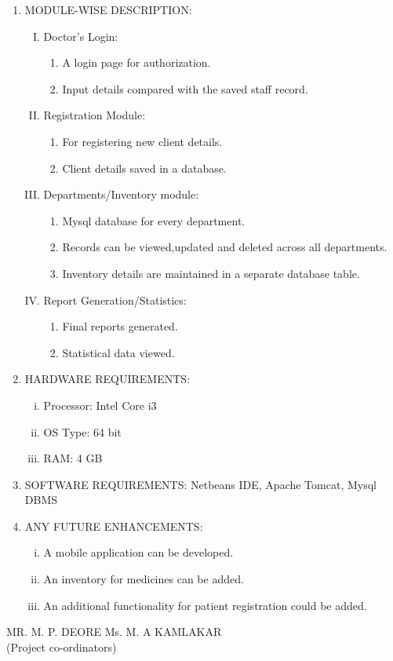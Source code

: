 \documentclass[11pt]{article}
\newcommand\tab[1][1cm]{\hspace*{#1}}
\begin{document}
\begin{enumerate}
\item MODULE-WISE DESCRIPTION:
\begin{enumerate}[(I)]
\item Doctor's Login:
\begin{enumerate}[1.]
\item A login page for authorization.
\item Input details compared with the saved staff record.
\end{enumerate}
\item Registration Module:
\begin{enumerate}[1.]
\item For registering new client details.
\item Client details saved in a database.
\end{enumerate}
\item Departments/Inventory module:
\begin{enumerate}[1.]
\item Mysql database for every department.
\item Records can be viewed,updated and deleted across all departments.
\item Inventory details are maintained in a separate database table.
\end{enumerate}
\item Report Generation/Statistics:
\begin{enumerate}[1.]
\item Final reports generated.
\item Statistical data viewed.

\end{enumerate}
\end{enumerate}
\item HARDWARE REQUIREMENTS:
\begin{enumerate}[(i)]
\item Processor: Intel Core i3
\item OS Type: 64 bit
\item RAM: 4 GB

\end{enumerate}
\item SOFTWARE REQUIREMENTS:
Netbeans IDE, Apache Tomcat, Mysql DBMS

\item ANY FUTURE ENHANCEMENTS:
\begin{enumerate}[(i)]
\item A mobile application can be developed.
\item An inventory for medicines can be added.
\item An additional functionality for patient registration could be added.
\end{enumerate}

\end{enumerate} 


\vspace{50mm}
MR. M. P. DEORE   \tab[2cm]     Ms. M. A KAMLAKAR \\
\tab[3cm] (Project co-ordinators)
\end{document}
